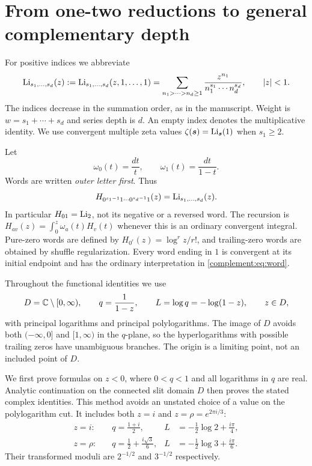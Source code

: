 \section{From one-two reductions to general complementary depth}

For positive indices we abbreviate
\begin{equation}\label{complement:eq:mpl}
\operatorname{Li}_{s_1,\ldots,s_d}(z)
 :=\operatorname{Li}_{s_1,\ldots,s_d}(z,1,\ldots,1)
 =\sum_{n_1>\cdots>n_d\ge1}
 \frac{z^{n_1}}{n_1^{s_1}\cdots n_d^{s_d}},\qquad |z|<1.
\end{equation}
The indices decrease in the summation order, as in the manuscript.
Weight is $w=s_1+\cdots+s_d$ and series depth is $d$.
An empty index denotes the multiplicative identity.
We use convergent multiple zeta values
$\zeta(\boldsymbol s)=\operatorname{Li}_{\boldsymbol s}(1)$ when $s_1\ge2$.

Let
\[
 \omega_0(t)=\frac{dt}{t},\qquad
 \omega_1(t)=\frac{dt}{1-t}.
\]
Words are written \emph{outer letter first}. Thus
\begin{equation}\label{complement:eq:word}
H_{0^{s_1-1}1\cdots0^{s_d-1}1}(z)=\operatorname{Li}_{s_1,\ldots,s_d}(z).
\end{equation}
In particular $H_{01}=\operatorname{Li}_2$, not its negative or a reversed word.
The recursion is
$H_{av}(z)=\int_0^z\omega_a(t)H_v(t)$ whenever this is an ordinary
convergent integral. Pure-zero words are defined by
$H_{0^r}(z)=\log^r z/r!$, and trailing-zero words are obtained by shuffle
regularization. Every word ending in $1$ is convergent at its initial
endpoint and has the ordinary interpretation in \eqref{complement:eq:word}.

Throughout the functional identities we use
\begin{equation}\label{complement:eq:domain}
 D=\mathbb C\setminus[0,\infty),\qquad
 q=\frac1{1-z},\qquad L=\log q=-\log(1-z),\qquad z\in D,
\end{equation}
with principal logarithms and principal polylogarithms. The image of $D$
avoids both $(-\infty,0]$ and $[1,\infty)$ in the $q$-plane, so the
hyperlogarithms with possible trailing zeros have unambiguous branches.
The origin is a limiting point, not an included point of $D$.

We first prove formulas on $z<0$, where $0<q<1$ and all logarithms in
$q$ are real. Analytic continuation on the connected slit domain $D$
then proves the stated complex identities. This method avoids an
unstated choice of a value on the polylogarithm cut. It includes both
$z=i$ and $z=\rho=e^{2\pi i/3}$:
\begin{align}
 z=i:&\quad q=\frac{1+i}{2},&L&=-\frac12\log2+\frac{i\pi}{4},\label{complement:eq:gausspoint}\\
 z=\rho:&\quad q=\frac12+\frac{i\sqrt3}{6},&L&=-\frac12\log3+\frac{i\pi}{6}.\label{complement:eq:eispoint}
\end{align}
Their transformed moduli are $2^{-1/2}$ and $3^{-1/2}$ respectively.

